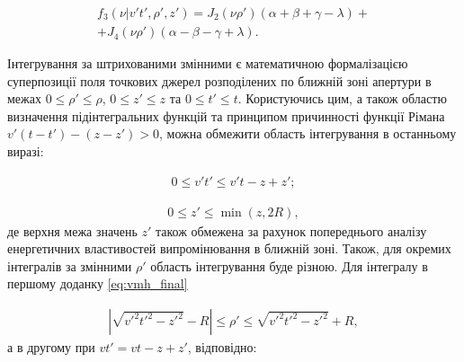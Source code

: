 \begin{equation} \begin{gathered}
f_3 ( \nu | v't', \rho', z') = 
J_2 (\nu \rho') (\alpha + \beta + \gamma - \lambda) + \\
+ J_4 (\nu \rho') (\alpha - \beta - \gamma + \lambda).
\end{gathered} \end{equation}

Інтегрування за штрихованими змінними є математичною формалізацією 
суперпозиції поля точкових джерел розподілених по ближній зоні апертури
в межах 
$ 0 \leq \rho' \leq \rho $, $ 0 \leq z' \leq z $ та $ 0 \leq t' \leq t $. 
Користуючись цим, а також областю визначення підінтегральних функцій та 
принципом причинності функції Рімана $ v'(t-t')-(z-z') > 0 $, можна обмежити 
область інтегрування в останньому виразі:

\begin{equation} \begin{aligned}
0 \leq v't' \leq v't - z + z';
\end{aligned} \end{equation}

\begin{equation} \begin{aligned}
0 \leq z' \leq \min(z,2R),
\end{aligned} \end{equation}
%
де верхня межа значень $ z' $ також обмежена за рахунок попереднього аналізу 
енергетичних властивостей випромінювання в ближній зоні. Також, для окремих 
інтегралів за змінними $ \rho' $ область інтегрування буде різною. Для 
інтегралу в першому доданку \eqref{eq:vmh_final}

\begin{equation} \begin{aligned}
\left| \sqrt{v'^2t'^2 - z'^2} - R \right| \leq \rho' \leq 
\sqrt{v'^2t'^2 - z'^2} + R,
\end{aligned} \end{equation}
%
а в другому при $ vt' = vt - z + z' $, відповідно:


